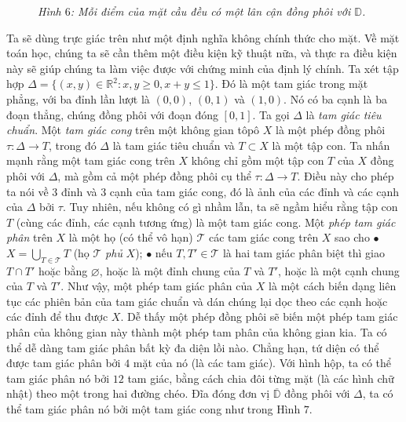 \begin{multicols}{2}
\begin{figure}[H]
		\caption{\small\textit{\color{duongvaotoanhoc}Hình $6$: Mỗi điểm của mặt cầu đều có một lân cận đồng phôi với $\mathbb{D}$.}}
		\vspace*{-10pt}
	\end{figure}
	Ta sẽ dùng trực giác trên như một định nghĩa không chính thức cho mặt. Về mặt toán học, chúng ta sẽ cần thêm một điều kiện kỹ thuật nữa, và thực ra điều kiện này sẽ giúp chúng ta làm việc được với chứng minh của định lý chính.
	\vskip 0.1cm
	Ta xét tập hợp $\Delta = \{(x,y) \in \mathbb{R}^2: x,y \ge 0, x+y \le 1\}$. Đó là một tam giác trong mặt phẳng, với ba đỉnh lần lượt là $(0,0)$, $(0,1)$ và $(1,0)$. Nó có ba cạnh là ba đoạn thẳng, chúng đồng phôi với đoạn đóng $[0,1]$. Ta gọi $\Delta$ là {\it tam giác tiêu chuẩn}. Một {\it tam giác cong} trên một không gian tôpô $X$ là một phép đồng phôi $\tau: \Delta \to T$, trong đó $\Delta$ là tam giác tiêu chuẩn và $T \subset X$ là một tập con. Ta nhấn mạnh rằng một tam giác cong trên $X$ không chỉ gồm một tập con $T$ của $X$ đồng phôi với $\Delta$, mà gồm cả một phép đồng phôi cụ thể $\tau: \Delta \to T$. Điều này cho phép ta nói về $3$ đỉnh và $3$ cạnh của tam giác cong, đó là ảnh của các đỉnh và các cạnh của $\Delta$ bởi $\tau$. Tuy nhiên, nếu không có gì nhầm lẫn, ta sẽ ngầm hiểu rằng tập con $T$ (cùng các đỉnh, các cạnh tương ứng) là một tam giác cong. 
	\vskip 0.1cm
	Một {\it phép tam giác phân} trên $X$ là một họ (có thể vô hạn) $\mathscr{T}$ các tam giác cong trên $X$ sao cho
	\vskip 0.1cm
	$\bullet$ $X = \bigcup_{T \in \mathscr{T}} T$ (họ $\mathscr{T}$ {\it phủ} $X$);
	\vskip 0.1cm
	$\bullet$ nếu $T,T' \in \mathscr{T}$ là hai tam giác phân biệt thì giao $T \cap T'$ hoặc bằng $\varnothing$, hoặc là một đỉnh chung của $T$ và $T'$, hoặc là một cạnh chung của $T$ và $T'$.
	\vskip 0.1cm
	Như vậy, một phép tam giác phân của $X$ là một cách biến dạng liên tục các phiên bản của tam giác chuẩn và dán chúng lại dọc theo các cạnh hoặc các đỉnh để thu được $X$. Dễ thấy một phép đồng phôi sẽ biến một phép tam giác phân của không gian này thành một phép tam phân của không gian kia. Ta có thể dễ dàng tam giác phân bất kỳ đa diện lồi nào. Chẳng hạn, tứ diện có thể được tam giác phân bởi $4$ mặt của nó (là các tam giác). Với hình hộp, ta có thể tam giác phân nó bởi $12$ tam giác, bằng cách chia đôi từng mặt (là các hình chữ nhật) theo một trong hai đường chéo. Đĩa đóng đơn vị $\overline{\mathbb{D}}$ đồng phôi với $\Delta$, ta có thể tam giác phân nó bởi một tam giác cong như trong Hình $7$.
	\begin{figure}[H]
		\vspace*{-5pt}

\end{figure}
\end{multicols}
